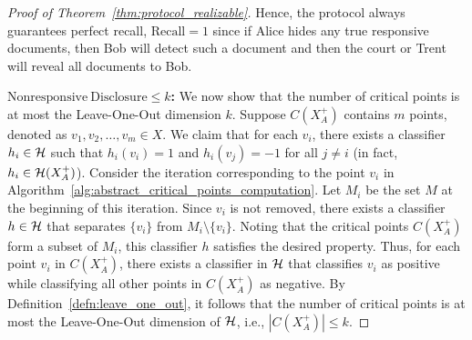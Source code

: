 \begin{proof}[Proof of Theorem~\ref{thm:protocol_realizable}]
    Hence, the protocol always guarantees perfect recall, $\mathrm{Recall} = 1$ since if Alice hides any true responsive documents, then Bob will detect such a document and then the court or Trent will reveal all documents to Bob. 


    \textbf{$\mathrm{Nonresponsive~Disclosure} \leq k$:} We now show that the number of critical points is at most the Leave-One-Out dimension $k$.
    Suppose $C(X_A^+)$ contains $m$ points, denoted as $v_1, v_2, \dots, v_m \in X$. We claim that for each $v_i$, there exists a classifier $h_i \in \mathcal{H}$ such that $h_i(v_i) = 1$ and $h_i(v_j) = -1$ for all $j \neq i$ (in fact, $h_i \in \mathcal{H}(X_A^+)$). 
    Consider the iteration corresponding to the point $v_i$ in Algorithm~\ref{alg:abstract_critical_points_computation}. Let $M_i$ be the set $M$ at the beginning of this iteration. Since $v_i$ is not removed, there exists a classifier $h \in \mathcal{H}$ that separates $\{v_i\}$ from $M_i \setminus \{v_i\}$. Noting that the critical points $C(X_A^+)$ form a subset of $M_i$, this classifier $h$ satisfies the desired property.
    Thus, for each point $v_i$ in $C(X_A^+)$, there exists a classifier in $\mathcal{H}$ that classifies $v_i$ as positive while classifying all other points in $C(X_A^+)$ as negative. By Definition~\ref{defn:leave_one_out}, it follows that the number of critical points is at most the Leave-One-Out dimension of $\mathcal{H}$, i.e., $|C(X_A^+)| \leq k$.


\end{proof}
